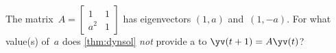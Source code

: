 \begin{activity}
The matrix~\(A=\begin{bmatrix} 1&1\\a^2&1 \end{bmatrix}\) has eigenvectors \((1,a)\) and~\((1,-a)\).
For what value(s) of~\(a\) does \autoref{thm:dynsol} \emph{not} provide a  to \(\yv(t+1)=A\yv(t)\)?
\end{activity}




